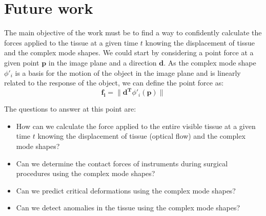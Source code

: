 \documentclass{article}
\begin{document}
\section*{Future work}
The main objective of the work must be to find a way to confidently calculate the forces applied to the tissue at a given time $t$ knowing the displacement of tissue and the complex mode shapes. We could start by considering a point force at a given point $\mathbf{p}$ in the image plane and a direction $\mathbf{d}$. As the complex mode shape $\phi'_{i}$ is a basis for the motion of the object in the image plane and is linearly related to the response of the object, we can define the point force as:
\begin{equation*}
    \mathbf{f_{i}} = \|\mathbf{d^{T}}\phi'_{i}(\mathbf{p})\|
\end{equation*}

The questions to answer at this point are:
\begin{itemize}
    \item How can we calculate the force applied to the entire visible tissue at a given time $t$ knowing the displacement of tissue (optical flow) and the complex mode shapes?
    \item Can we determine the contact forces of instruments during surgical procedures using the complex mode shapes?
    \item Can we predict critical deformations using the complex mode shapes?
    \item Can we detect anomalies in the tissue using the complex mode shapes?
\end{itemize}

\newpage


\end{document}
